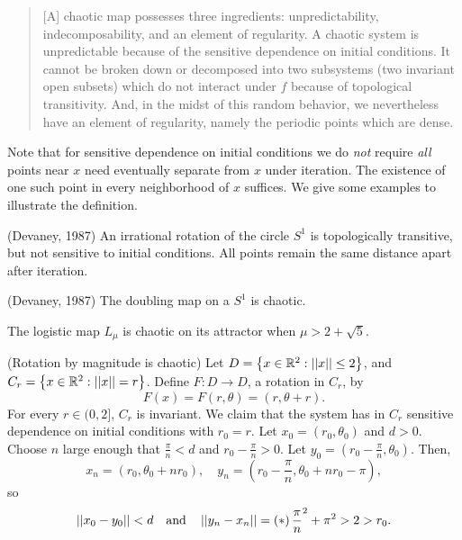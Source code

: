 \documentclass[12pt,draft,twoside]{book}
\begin{document}
%
\citet[p.50]{devaney}
\begin{quotation}
  [A] chaotic map possesses three ingredients:
  unpredictability, indecomposability, and an element of regularity.
  A chaotic system is unpredictable because of the sensitive dependence on initial conditions.
  It cannot be broken down or decomposed into two subsystems (two invariant open subsets) which do not interact under $f$ because of topological transitivity.
    And, in the midst of this random behavior, we nevertheless have an element of regularity, namely the periodic points which are dense.
  \end{quotation}
  \noindent Note that for sensitive dependence on initial conditions we do \textit{not} require \textit{all} points near $x$ need eventually separate from $x$ under iteration.
  The existence of one such point in every neighborhood of $x$ suffices.
  We give some examples to illustrate the definition.
  \begin{example}
    (Devaney, 1987)
    An irrational rotation of the circle $S^1$ is topologically transitive, but not sensitive to initial conditions.
    All points remain the same distance apart after iteration.
  \end{example}
  \begin{example}
    (Devaney, 1987)
    The doubling map on a $S^1$ is chaotic.
  \end{example}
  \begin{example}
    The logistic map $L_\mu$ is chaotic on its attractor when $\mu > 2 + \sqrt{5}$.
  \end{example}
  \begin{example}
    (Rotation by magnitude is chaotic)
    Let $D = \left \{ x \in \mathbb{R}^2: \left|\left| x \right|\right| \leq 2 \right \}$, and $C_r = \left \{ x \in \mathbb{R}^2: \left|\left| x \right|\right| = r \right \}$.
    Define $F: D \to D$, a rotation in $C_r$, by
    \begin{equation*}
      F(x) = F(r, \theta) = (r, \theta + r).
    \end{equation*}
    For every $r \in (0,2]$, $C_r$ is invariant.
    We claim that the system has in $C_r$ sensitive dependence on initial conditions with $r_0 = r$.
    Let $x_0 = (r_0, \theta_0)$ and $d > 0$.
    Choose $n$ large enough that $\frac{\pi}{n} < d$ and $r_0 - \frac{\pi}{n} > 0$.
    Let $y_0 = (r_0 - \frac{\pi}{n}, \theta_0)$.
    Then,
    \begin{equation*}
      x_n = (r_0, \theta_0 + nr_0),\quad
      y_n = (r_0 - \frac{\pi}{n}, \theta_0 + nr_0 - \pi),
    \end{equation*}
    so
    \begin{equation*}
      \left|\left| x_0 - y_0 \right|\right| < d \quad\mbox{and}\quad \left|\left| y_n - x_n \right|\right| = \left ( * \right ){\frac{\pi}{n}}^2 + \pi^2 > 2 > r_0.
    \end{equation*}
  \end{example}
\end{document}
